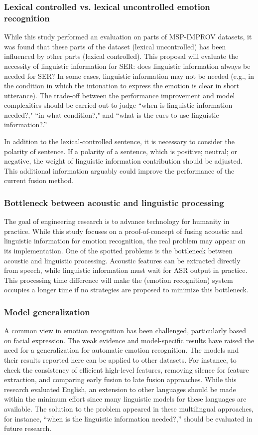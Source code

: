 \subsubsection{Lexical controlled vs. lexical uncontrolled emotion recognition}
While this study performed an evaluation on parts of MSP-IMPROV datasets, it
was found that these parts of the dataset (lexical uncontrolled) has been
influenced by other parts (lexical controlled). This proposal will evaluate the
necessity of linguistic information for SER: does linguistic information always
be needed for SER? In some cases, linguistic information may not be needed
(e.g., in the condition in which the intonation to express the emotion is clear
in short utterance). The trade-off between the performance improvement and
model complexities should be carried out to judge ``when is linguistic
information needed?," ``in what condition?," and ``what is the cues to use
linguistic information?.''

In addition to the lexical-controlled sentence, it is necessary to consider the
polarity of sentence. If a polarity of a sentence, which is positive; neutral;
or negative, the weight of linguistic information contribution should be
adjusted. This additional information arguably could improve the performance of
the current fusion method.

\subsubsection{Bottleneck between acoustic and linguistic processing}
The goal of engineering research is to advance technology for humanity in
practice. While this study focuses on a proof-of-concept of fusing acoustic
and linguistic information for emotion recognition, the real problem may appear
on its implementation. One of the spotted problems is the bottleneck between
acoustic and linguistic processing.  Acoustic features can be extracted
directly from speech, while linguistic information must wait for ASR output in
practice. This processing  time difference will make the (emotion recognition)
system occupies a longer time if no strategies are proposed to minimize this
bottleneck.

\subsubsection{Model generalization}
A common view in emotion recognition has been challenged, particularly based on
facial expression. The weak evidence and model-specific results have raised the
need for a generalization for automatic emotion recognition. The models and
their results reported here can be applied to other datasets. For instance, to
check the consistency of efficient high-level features, removing silence for
feature extraction, and comparing early fusion to late fusion approaches. While
this research evaluated English, an extension to other languages should be made
within the minimum effort since many linguistic models for these languages are
available. The solution to the problem appeared in these multilingual
approaches, for instance, ``when is the linguistic information needed?,''
should be evaluated in future research.

